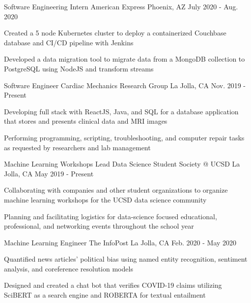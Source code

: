 
\begin{cventries}   
  \cventry
    {Software Engineering Intern} %
    {American Express} %
    {Phoenix, AZ} %
    {July 2020 - Aug. 2020} %
    {
      \begin{cvitems} %
        \item {Created a 5 node Kubernetes cluster to deploy a containerized Couchbase database and CI/CD pipeline with Jenkins}
        \item {Developed a data migration tool to migrate data from a MongoDB collection to PostgreSQL using NodeJS and transform streams}
      \end{cvitems}
    }
 
  \cventry
    {Software Engineer} %
    {Cardiac Mechanics Research Group} %
    {La Jolla, CA} %
    {Nov. 2019 - Present} %
    {
      \begin{cvitems} %
        \item {Developing full stack with ReactJS, Java, and SQL for a database application that stores and presents clinical data and MRI images}
        \item {Performing programming, scripting, troubleshooting, and computer repair tasks as requested by researchers and lab management}
      \end{cvitems}
    }
  
  \cventry
    {Machine Learning Workshops Lead} %
    {Data Science Student Society @ UCSD} %
    {La Jolla, CA} %
    {May 2019 - Present} %
    {
      \begin{cvitems} %
        \item {Collaborating with companies and other student organizations to organize machine learning workshops for the UCSD data science community}
        \item {Planning and facilitating logistics for data-science focused educational, professional, and networking events throughout the school year}
      \end{cvitems}
    }

  \cventry
    {Machine Learning Engineer} %
    {The InfoPost} %
    {La Jolla, CA} %
    {Feb. 2020 - May 2020} %
    {
      \begin{cvitems} %
        \item {Quantified news articles' political bias using named entity recognition, sentiment analysis, and coreference resolution models}
        \item {Designed and created a chat bot that verifies COVID-19 claims utilizing SciBERT as a search engine and ROBERTA for textual entailment}
      \end{cvitems}
    }
    

\end{cventries}
